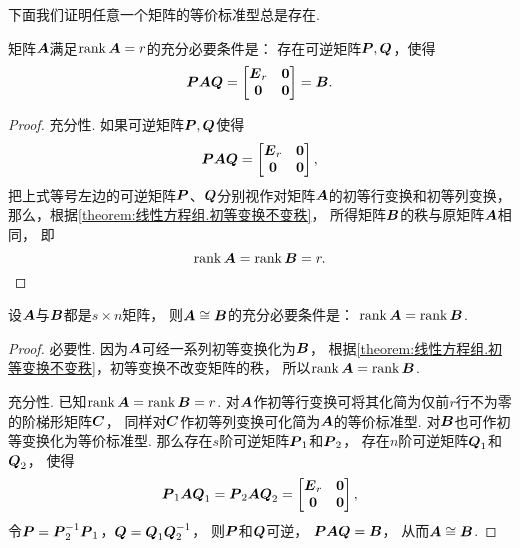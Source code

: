 下面我们证明任意一个矩阵的等价标准型总是存在.
\begin{theorem}\label{theorem:矩阵乘积的秩.等价标准型的存在性}
矩阵\(\boldsymbol{A}\)满足\(\rank\boldsymbol{A}=r\)的充分必要条件是：
存在可逆矩阵\(\boldsymbol{P},\boldsymbol{Q}\)，使得\[
	\boldsymbol{P} \boldsymbol{A} \boldsymbol{Q}
	= \begin{bmatrix}
		\boldsymbol{E}_r & \boldsymbol0 \\
		\boldsymbol0 & \boldsymbol0
	\end{bmatrix} = \boldsymbol{B}.
\]
\begin{proof}
充分性.
如果可逆矩阵\(\boldsymbol{P},\boldsymbol{Q}\)使得\[
	\boldsymbol{P}\boldsymbol{A}\boldsymbol{Q}
	= \begin{bmatrix}
		\boldsymbol{E}_r & \boldsymbol0 \\
		\boldsymbol0 & \boldsymbol0
	\end{bmatrix},
\]
把上式等号左边的可逆矩阵\(\boldsymbol{P}\)、\(\boldsymbol{Q}\)分别视作对矩阵\(\boldsymbol{A}\)的初等行变换和初等列变换，
那么，根据\cref{theorem:线性方程组.初等变换不变秩}，
所得矩阵\(\boldsymbol{B}\)的秩与原矩阵\(\boldsymbol{A}\)相同，
即\[
	\rank\boldsymbol{A} = \rank\boldsymbol{B} = r.
	\qedhere
\]
\end{proof}
\end{theorem}

\begin{theorem}\label{theorem:矩阵乘积的秩.矩阵等价的充分必要条件}
设\(\boldsymbol{A}\)与\(\boldsymbol{B}\)都是\(s \times n\)矩阵，
则\(\boldsymbol{A} \cong \boldsymbol{B}\)的充分必要条件是：
\(\rank\boldsymbol{A} = \rank\boldsymbol{B}\).
\begin{proof}
必要性.
因为\(\boldsymbol{A}\)可经一系列初等变换化为\(\boldsymbol{B}\)，
根据\cref{theorem:线性方程组.初等变换不变秩}，初等变换不改变矩阵的秩，
所以\(\rank\boldsymbol{A} = \rank\boldsymbol{B}\).

充分性.
已知\(\rank\boldsymbol{A} = \rank\boldsymbol{B} = r\).
对\(\boldsymbol{A}\)作初等行变换可将其化简为仅前\(r\)行不为零的阶梯形矩阵\(\boldsymbol{C}\)，
同样对\(\boldsymbol{C}\)作初等列变换可化简为\(\boldsymbol{A}\)的等价标准型.
对\(\boldsymbol{B}\)也可作初等变换化为等价标准型.
那么存在\(s\)阶可逆矩阵\(\boldsymbol{P}_1\)和\(\boldsymbol{P}_2\)，
存在\(n\)阶可逆矩阵\(\boldsymbol{Q}_1\)和\(\boldsymbol{Q}_2\)，
使得\[
	\boldsymbol{P}_1 \boldsymbol{A} \boldsymbol{Q}_1 = \boldsymbol{P}_2 \boldsymbol{A} \boldsymbol{Q}_2
	= \begin{bmatrix} \boldsymbol{E}_r & \boldsymbol0 \\ \boldsymbol0 & \boldsymbol0 \end{bmatrix},
\]
令\(\boldsymbol{P} = \boldsymbol{P}_2^{-1} \boldsymbol{P}_1\)，\(\boldsymbol{Q} = \boldsymbol{Q}_1 \boldsymbol{Q}_2^{-1}\)，
则\(\boldsymbol{P}\)和\(\boldsymbol{Q}\)可逆，
\(\boldsymbol{P} \boldsymbol{A} \boldsymbol{Q} = \boldsymbol{B}\)，
从而\(\boldsymbol{A} \cong \boldsymbol{B}\).
\end{proof}
\end{theorem}

